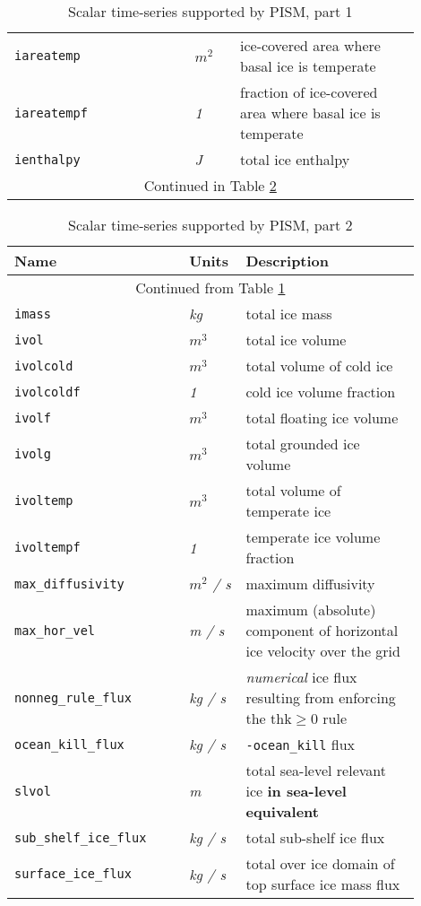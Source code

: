 \begin{table}[ht]
\begin{tabular}{p{0.4\linewidth}p{0.1\linewidth}p{0.4\linewidth}}
    \texttt{iareatemp} & \textsl{$m^{2}$} &  ice-covered area where basal ice is temperate \\
    \texttt{iareatempf} & \textsl{1} &  fraction of ice-covered area where basal ice is temperate \\
    \texttt{ienthalpy} & \textsl{J} &  total ice enthalpy \\
    \multicolumn{3}{c}{Continued in Table \ref{tab:time-series-2}}\\
    \bottomrule
  \end{tabular}
\caption{Scalar time-series supported by PISM, part 1}
\label{tab:time-series-1}
\end{table}

\begin{table}[ht]
  \centering
 \begin{tabular}{p{0.4\linewidth}p{0.1\linewidth}p{0.4\linewidth}}
    \toprule
    \textbf{Name} & \textbf{Units} & \textbf{Description}\\
    \midrule
    \multicolumn{3}{c}{Continued from Table \ref{tab:time-series-1}}\\
    \texttt{imass} & \textsl{kg} &  total ice mass \\
    \texttt{ivol} & \textsl{$m^{3}$} &  total ice volume \\
    \texttt{ivolcold} & \textsl{$m^{3}$} &  total volume of cold ice \\
    \texttt{ivolcoldf} & \textsl{1} &  cold ice volume fraction \\
    \texttt{ivolf} & \textsl{$m^{3}$} &  total floating ice volume \\
    \texttt{ivolg} & \textsl{$m^{3}$} &  total grounded ice volume \\
    \texttt{ivoltemp} & \textsl{$m^{3}$} &  total volume of temperate ice \\
    \texttt{ivoltempf} & \textsl{1} &  temperate ice volume fraction \\
    \texttt{max_diffusivity} & \textsl{$m^{2}$  / s} &  maximum diffusivity \\
    \texttt{max_hor_vel} & \textsl{m  / s} &  maximum (absolute) component of horizontal ice velocity over the grid \\
    \texttt{nonneg_rule_flux} & \textsl{kg  / s} &  \emph{numerical} ice flux resulting from enforcing the $\mathrm{thk} \ge 0$ rule \\
    \texttt{ocean_kill_flux} & \textsl{kg  / s} &  \texttt{-ocean_kill} flux \\
    \texttt{slvol} & \textsl{m} &  total sea-level relevant ice \textbf{in sea-level equivalent} \\
    \texttt{sub_shelf_ice_flux} & \textsl{kg  / s} &  total sub-shelf ice flux \\
    \texttt{surface_ice_flux} & \textsl{kg  / s} &  total over ice domain of top surface ice mass flux \\
    \bottomrule
  \end{tabular}
\caption{Scalar time-series supported by PISM, part 2}
\label{tab:time-series-2}
\end{table}


